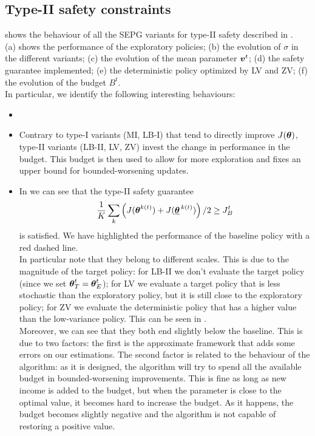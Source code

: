\subsection{Type-II safety constraints}
 shows the behaviour of all the SEPG variants for type-II safety described in . \\
(a) shows the performance of the exploratory policies; (b) the evolution of $\sigma$ in the different variants; (c) the evolution of the mean parameter $\vv^t$; (d) the safety guarantee implemented; (e) the deterministic policy optimized by LV and ZV; (f) the evolution of the budget $B^t$. \\
In particular, we identify the following interesting behaviours:
\begin{itemize}
\item 
\item Contrary to type-I variants (MI, LB-I) that  tend to directly improve $J(\vtheta)$, type-II variants (LB-II, LV, ZV) invest the change in performance in the budget. This budget is then used to allow for more exploration and fixes an upper bound for bounded-worsening updates. 
\item In  we can see that the type-II safety guarantee
\[
\frac{1}{K}\sum_k \left(J(\vtheta^{k(t)}) + J(\vtarget[k(t)])\right)/2 \geq \jbase
\]
is satisfied. We have highlighted the performance of the baseline policy with a red dashed line. \\
In particular note that they belong to different scales. This is due to the magnitude of the target policy: for LB-II we don't evaluate the target policy (since we set $\vtheta^t_T = \vtheta^t_E$); for LV we evaluate a target policy that is less stochastic than the exploratory policy, but it is still close to the exploratory policy; for ZV we evaluate the deterministic policy that has a higher value than the low-variance policy. This can be seen in . \\
Moreover, we can see that they both end slightly below the baseline. This is due to two factors: the first is the approximate framework that adds some errors on our estimations. The second factor is related to the behaviour of the algorithm: as it is designed, the algorithm will try to spend all the available budget in bounded-worsening improvements. This is fine as long as new income is added to the budget, but when the parameter is close to the optimal value, it becomes hard to increase the budget. As it happens, the budget becomes slightly negative and the algorithm is not capable of restoring a positive value. 


\end{itemize}
